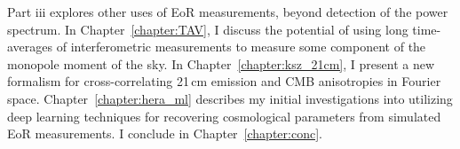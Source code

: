 Part {\sc iii} explores other uses of EoR measurements, beyond detection of the power spectrum. In Chapter~\ref{chapter:TAV}, I discuss the potential of using long time-averages of interferometric measurements to measure some component of the monopole moment of the sky. In Chapter~\ref{chapter:ksz_21cm}, I present a new formalism for cross-correlating 21\,cm emission and CMB anisotropies in Fourier space. Chapter~\ref{chapter:hera_ml} describes my initial investigations into utilizing deep learning techniques for recovering cosmological parameters from simulated EoR measurements. I conclude in Chapter~\ref{chapter:conc}.


